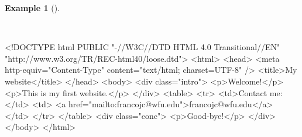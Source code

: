 \documentclass[
  letterpaper,
  DIV=11,
  numbers=noendperiod]{scrreport}
\newenvironment{Shaded}{\begin{snugshade}}{\end{snugshade}}
\newcommand{\DataTypeTok}[1]{\textcolor[rgb]{0.00,0.00,0.00}{#1}}
\newcommand{\ErrorTok}[1]{\textcolor[rgb]{0.00,0.00,0.00}{#1}}
\newcommand{\KeywordTok}[1]{\textcolor[rgb]{0.00,0.00,0.00}{#1}}
\newcommand{\NormalTok}[1]{\textcolor[rgb]{0.00,0.00,0.00}{#1}}
\newcommand{\OtherTok}[1]{\textcolor[rgb]{0.00,0.00,0.00}{#1}}
\newcommand{\StringTok}[1]{\textcolor[rgb]{0.00,0.00,0.00}{#1}}
\theoremstyle{definition}
\newtheorem{example}{Example}[chapter]
\theoremstyle{remark}
\begin{document}
\begin{example}[]\protect\hypertarget{exm-ad-html-structure}{}\label{exm-ad-html-structure}

~

\begin{Shaded}
\begin{Highlighting}[]
\DataTypeTok{\textless{}!DOCTYPE }\NormalTok{html PUBLIC "{-}//W3C//DTD HTML 4.0 Transitional//EN" "http://www.w3.org/TR/REC{-}html40/loose.dtd"}\DataTypeTok{\textgreater{}}
\KeywordTok{\textless{}html\textgreater{}}
  \KeywordTok{\textless{}head\textgreater{}}
    \KeywordTok{\textless{}meta} \ErrorTok{http{-}equiv}\OtherTok{=}\StringTok{"Content{-}Type"} \ErrorTok{content}\OtherTok{=}\StringTok{"text/html; charset=UTF{-}8"} \KeywordTok{/\textgreater{}}
    \KeywordTok{\textless{}title\textgreater{}}\NormalTok{My website}\KeywordTok{\textless{}/title\textgreater{}}
  \KeywordTok{\textless{}/head\textgreater{}}
  \KeywordTok{\textless{}body\textgreater{}}
    \KeywordTok{\textless{}div} \ErrorTok{class}\OtherTok{=}\StringTok{"intro"}\KeywordTok{\textgreater{}}
      \KeywordTok{\textless{}p\textgreater{}}\NormalTok{Welcome!}\KeywordTok{\textless{}/p\textgreater{}}
      \KeywordTok{\textless{}p\textgreater{}}\NormalTok{This is my first website.}\KeywordTok{\textless{}/p\textgreater{}}
    \KeywordTok{\textless{}/div\textgreater{}}
    \KeywordTok{\textless{}table\textgreater{}}
      \KeywordTok{\textless{}tr\textgreater{}}
        \KeywordTok{\textless{}td\textgreater{}}\NormalTok{Contact me:}\KeywordTok{\textless{}/td\textgreater{}}
        \KeywordTok{\textless{}td\textgreater{}}
          \KeywordTok{\textless{}a} \ErrorTok{href}\OtherTok{=}\StringTok{"mailto:francojc@wfu.edu"}\KeywordTok{\textgreater{}}\NormalTok{francojc@wfu.edu}\KeywordTok{\textless{}/a\textgreater{}}
        \KeywordTok{\textless{}/td\textgreater{}}
      \KeywordTok{\textless{}/tr\textgreater{}}
    \KeywordTok{\textless{}/table\textgreater{}}
    \KeywordTok{\textless{}div} \ErrorTok{class}\OtherTok{=}\StringTok{"conc"}\KeywordTok{\textgreater{}}
      \KeywordTok{\textless{}p\textgreater{}}\NormalTok{Good{-}bye!}\KeywordTok{\textless{}/p\textgreater{}}
    \KeywordTok{\textless{}/div\textgreater{}}
  \KeywordTok{\textless{}/body\textgreater{}}
\KeywordTok{\textless{}/html\textgreater{}}
\end{Highlighting}
\end{Shaded}

\end{example}
\end{document}
